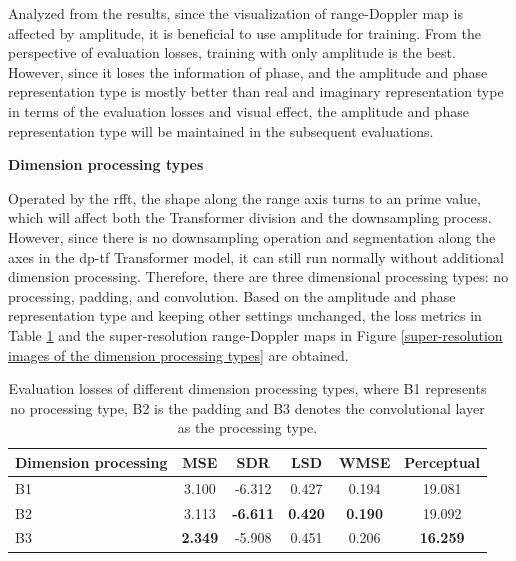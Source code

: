 Analyzed from the results, since the visualization of range-Doppler map is affected by amplitude, it is beneficial to use amplitude for training. From the perspective of evaluation losses, training with only amplitude is the best. However, since it loses the information of phase, and the amplitude and phase representation type is mostly better than real and imaginary representation type in terms of the evaluation losses and visual effect, the amplitude and phase representation type will be maintained in the subsequent evaluations.

\begin{spacing}{1.5}
\textbf{\large{Dimension processing types}}
\end{spacing}
Operated by the \gls{rfft}, the shape along the range axis turns to an prime value, which will affect both the Transformer division and the downsampling process. However, since there is no downsampling operation and segmentation along the axes in the \gls{dp}-\gls{tf} Transformer model, it can still run normally without additional dimension processing. Therefore, there are three dimensional processing types: no processing, padding, and convolution. Based on the amplitude and phase representation type and keeping other settings unchanged, the loss metrics in Table \ref{Evaluation losses of the dimension processing types comparison} and the super-resolution range-Doppler maps in Figure \ref{super-resolution images of the dimension processing types} are obtained.

\begin{table}
    \centering
    \caption{Evaluation losses of different dimension processing types, where B1 represents no processing type, B2 is the padding and B3 denotes the convolutional layer as the processing type.}
    \label{Evaluation losses of the dimension processing types comparison}
    \begin{tabular}{l|c|c|c|c|c}
        \hline
        Dimension processing & MSE & SDR & LSD & WMSE & Perceptual \\
        \hline
        B1 & 3.100 & -6.312 & 0.427 & 0.194 & 19.081 \\
        \hline
        B2 & 3.113 & \textbf{-6.611} & \textbf{0.420} & \textbf{0.190} & 19.092 \\
        \hline
        B3 & \textbf{2.349} & -5.908 & 0.451 & 0.206 & \textbf{16.259} \\
        \hline
    \end{tabular}
\end{table}

